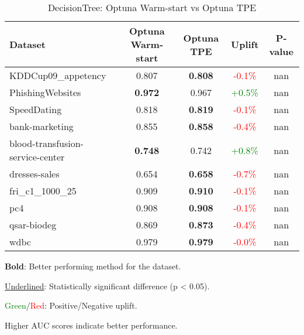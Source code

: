 \begin{table}[htbp]
\centering
\caption{DecisionTree: Optuna Warm-start vs Optuna TPE}
\label{tab:decisiontree_warmstart_vs_optuna}
\begin{tabular}{lcccc}
\toprule
Dataset & Optuna Warm-start & Optuna TPE & Uplift & P-value \\
\midrule
KDDCup09\_appetency & 0.807 & \textbf{0.808} & \textcolor{red}{-0.1\%} & nan \\
PhishingWebsites & \textbf{0.972} & 0.967 & \textcolor{green}{+0.5\%} & nan \\
SpeedDating & 0.818 & \textbf{0.819} & \textcolor{red}{-0.1\%} & nan \\
bank-marketing & 0.855 & \textbf{0.858} & \textcolor{red}{-0.4\%} & nan \\
blood-transfusion-service-center & \textbf{0.748} & 0.742 & \textcolor{green}{+0.8\%} & nan \\
dresses-sales & 0.654 & \textbf{0.658} & \textcolor{red}{-0.7\%} & nan \\
fri\_c1\_1000\_25 & 0.909 & \textbf{0.910} & \textcolor{red}{-0.1\%} & nan \\
pc4 & 0.908 & \textbf{0.908} & \textcolor{red}{-0.1\%} & nan \\
qsar-biodeg & 0.869 & \textbf{0.873} & \textcolor{red}{-0.4\%} & nan \\
wdbc & 0.979 & \textbf{0.979} & \textcolor{red}{-0.0\%} & nan \\
\bottomrule
\end{tabular}
\begin{tablenotes}
\small
\item \textbf{Bold}: Better performing method for the dataset.
\item \underline{Underlined}: Statistically significant difference (p < 0.05).
\item \textcolor{green}{Green}/\textcolor{red}{Red}: Positive/Negative uplift.
\item Higher AUC scores indicate better performance.
\end{tablenotes}
\end{table}